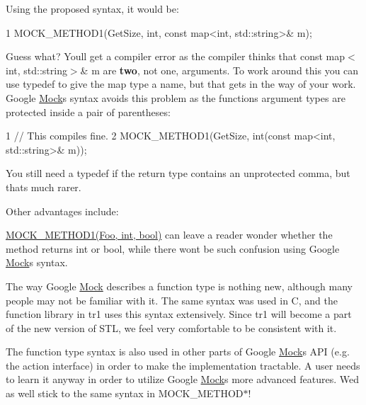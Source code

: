 Using the proposed syntax, it would be\+: 
\begin{DoxyCode}
1 MOCK\_METHOD1(GetSize, int, const map<int, std::string>& m);
\end{DoxyCode}


Guess what? You\textquotesingle{}ll get a compiler error as the compiler thinks that {\ttfamily const map$<$int, std\+::string$>$\& m} are {\bfseries two}, not one, arguments. To work around this you can use {\ttfamily typedef} to give the map type a name, but that gets in the way of your work. Google \hyperlink{class_mock}{Mock}\textquotesingle{}s syntax avoids this problem as the function\textquotesingle{}s argument types are protected inside a pair of parentheses\+: 
\begin{DoxyCode}
1 // This compiles fine.
2 MOCK\_METHOD1(GetSize, int(const map<int, std::string>& m));
\end{DoxyCode}


You still need a {\ttfamily typedef} if the return type contains an unprotected comma, but that\textquotesingle{}s much rarer.

Other advantages include\+:
\begin{DoxyEnumerate}
\item {\ttfamily \hyperlink{gmock-generated-function-mockers_8h_ac49d366be035ee87b73264a29059cdc7}{M\+O\+C\+K\+\_\+\+M\+E\+T\+H\+O\+D1(\+Foo, int, bool)}} can leave a reader wonder whether the method returns {\ttfamily int} or {\ttfamily bool}, while there won\textquotesingle{}t be such confusion using Google \hyperlink{class_mock}{Mock}\textquotesingle{}s syntax.
\end{DoxyEnumerate}
\begin{DoxyEnumerate}
\item The way Google \hyperlink{class_mock}{Mock} describes a function type is nothing new, although many people may not be familiar with it. The same syntax was used in C, and the {\ttfamily function} library in {\ttfamily tr1} uses this syntax extensively. Since {\ttfamily tr1} will become a part of the new version of S\+TL, we feel very comfortable to be consistent with it.
\end{DoxyEnumerate}
\begin{DoxyEnumerate}
\item The function type syntax is also used in other parts of Google \hyperlink{class_mock}{Mock}\textquotesingle{}s A\+PI (e.\+g. the action interface) in order to make the implementation tractable. A user needs to learn it anyway in order to utilize Google \hyperlink{class_mock}{Mock}\textquotesingle{}s more advanced features. We\textquotesingle{}d as well stick to the same syntax in {\ttfamily M\+O\+C\+K\+\_\+\+M\+E\+T\+H\+O\+D$\ast$}!
\end{DoxyEnumerate}

